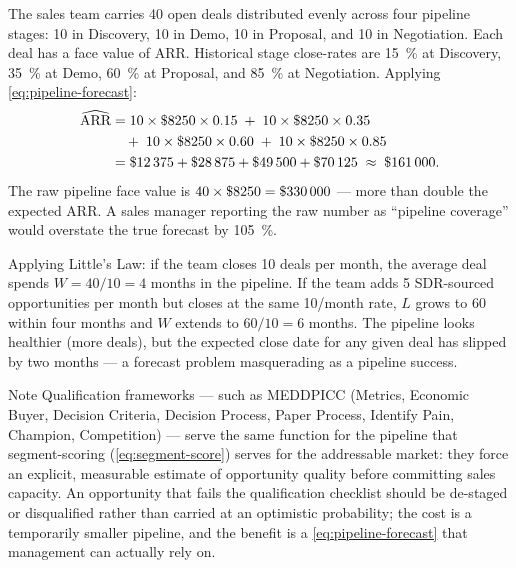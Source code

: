 \begin{example}
The sales team carries \num{40} open deals distributed evenly across four pipeline stages:
\num{10} in Discovery, \num{10} in Demo, \num{10} in Proposal, and \num{10} in Negotiation.
Each deal has a face value of  ARR. Historical stage close-rates are
\qty{15}{\percent} at Discovery, \qty{35}{\percent} at Demo, \qty{60}{\percent} at Proposal,
and \qty{85}{\percent} at Negotiation. Applying \cref{eq:pipeline-forecast}:
\begin{align*}
  \widehat{\text{ARR}}
    &= 10\times\$\num{8250}\times0.15
    \;+\; 10\times\$\num{8250}\times0.35 \\
    &\quad +\; 10\times\$\num{8250}\times0.60
    \;+\; 10\times\$\num{8250}\times0.85 \\
    &= \$\num{12375} + \$\num{28875} + \$\num{49500} + \$\num{70125}
     \;\approx\; \$\num{161000}.
\end{align*}
The raw pipeline face value is \(40\times\$\num{8250}=\$\num{330000}\) --- more than double
the  expected ARR. A sales manager reporting the raw number as ``pipeline
coverage'' would overstate the true forecast by \qty{105}{\percent}.

Applying Little's Law: if the team closes \num{10} deals per month, the average deal spends
\(W = 40/10 = 4\) months in the pipeline. If the team adds \num{5} SDR-sourced opportunities
per month but closes at the same \num{10}/month rate, \(L\) grows to \num{60} within four
months and \(W\) extends to \(60/10 = 6\) months. The pipeline looks healthier (more deals),
but the expected close date for any given deal has slipped by two months --- a forecast
problem masquerading as a pipeline success.
\end{example}

\begin{admonition}{Note}
Qualification frameworks --- such as MEDDPICC (Metrics, Economic Buyer, Decision Criteria,
Decision Process, Paper Process, Identify Pain, Champion, Competition) --- serve the same
function for the pipeline that segment-scoring (\cref{eq:segment-score}) serves for the
addressable market: they force an explicit, measurable estimate of opportunity quality before
committing sales capacity. An opportunity that fails the qualification checklist should be
de-staged or disqualified rather than carried at an optimistic probability; the cost is a
temporarily smaller pipeline, and the benefit is a \cref{eq:pipeline-forecast} that
management can actually rely on.
\end{admonition}

